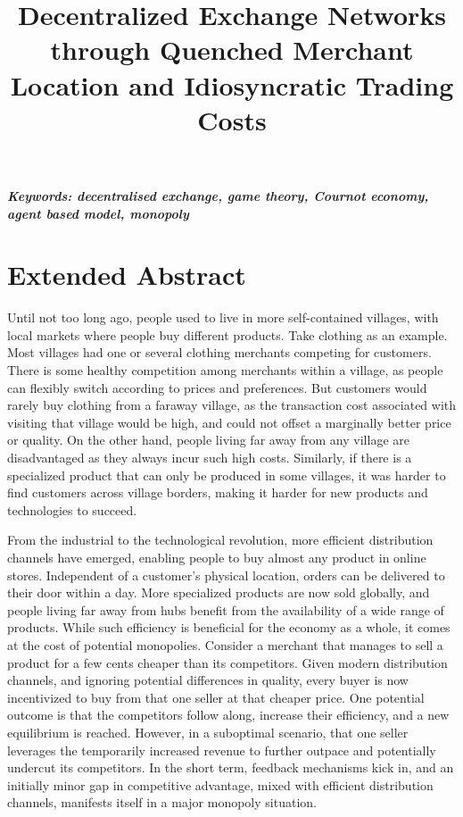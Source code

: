 \documentclass[a4paper,12pt]{article}
\title{Decentralized Exchange Networks through Quenched Merchant Location and Idiosyncratic Trading Costs}
\author[]{} %
\date{}
\begin{document}
\maketitle
\thispagestyle{fancy}

\vspace{-6em}
\begin{center}
\textbf{\textit{Keywords: decentralised exchange, game theory, Cournot economy, agent based model, monopoly}} 
\newline
\end{center}

\section*{Extended Abstract}

Until not too long ago, people used to live in more self-contained villages, with local markets where people buy different products. 
Take clothing as an example. Most villages had one or several clothing merchants competing for customers. 
There is some healthy competition among merchants within a village, as people can flexibly switch according to prices and preferences.
But customers would rarely buy clothing from a faraway village, as the transaction cost associated with visiting that village would be high, 
and could not offset a marginally better price or quality. 
On the other hand, people living far away from any village are disadvantaged as they always incur such high costs.
Similarly, if there is a specialized product that can only be produced in some villages, it was harder to find customers across village borders, 
making it harder for new products and technologies to succeed. 

From the industrial to the technological revolution, more efficient distribution channels have emerged, enabling people to buy almost any product in online stores. 
Independent of a customer's physical location, orders can be delivered to their door within a day. 
More specialized products are now sold globally, and people living far away from hubs benefit from the availability of a wide range of products. 
While such efficiency is beneficial for the economy as a whole, it comes at the cost of potential monopolies. 
Consider a merchant that manages to sell a product for a few cents cheaper than its competitors. 
Given modern distribution channels, and ignoring potential differences in quality, every buyer is now incentivized to buy from that one seller at that cheaper price.
One potential outcome is that the competitors follow along, increase their efficiency, and a new equilibrium is reached. 
However, in a suboptimal scenario, that one seller leverages the temporarily increased revenue to further outpace and potentially undercut its competitors. 
In the short term, feedback mechanisms kick in, and an initially minor gap in competitive advantage, mixed with efficient distribution channels, manifests itself in a major monopoly situation. 
\end{document}
